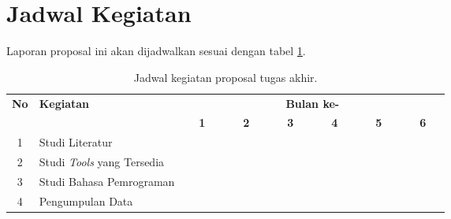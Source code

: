 \section{Jadwal Kegiatan}
Laporan proposal ini akan dijadwalkan sesuai dengan tabel \ref{ScheduleTable}. 
\begin{table}[h!]
  \centering
    \caption{Jadwal kegiatan proposal tugas akhir.}
  \label{ScheduleTable}
  \begin{tabular}{|c|m{2.5cm}|m{0.01cm}|m{0.01cm}|m{0.01cm}|m{0.01cm}|m{0.01cm}|m{0.01cm}|m{0.01cm}|m{0.01cm}|m{0.01cm}|m{0.01cm}|m{0.01cm}|m{0.01cm}|m{0.01cm}|m{0.01cm}|m{0.01cm}|m{0.01cm}|m{0.01cm}|m{0.01cm}|m{0.01cm}|m{0.01cm}|m{0.01cm}|m{0.01cm}|m{0.01cm}|m{0.01cm}|}
    \hline
    \multirow{2}{*}{\textbf{No}} & \multirow{2}{*}{\textbf{Kegiatan}} & \multicolumn{24}{|c|}{\textbf{Bulan ke-}} \\
    \hhline{~~------------------------}
    {} & {} & \multicolumn{4}{|c|}{\textbf{1}} & \multicolumn{4}{|c|}{\textbf{2}} & \multicolumn{4}{|c|}{\textbf{3}} & \multicolumn{4}{|c|}{\textbf{4}} & \multicolumn{4}{|c|}{\textbf{5}} & \multicolumn{4}{|c|}{\textbf{6}}\\
    \hline
    1 & Studi Literatur & \cellcolor{blue!25} & \cellcolor{blue!25} & \cellcolor{blue!25} & \cellcolor{blue!25}& \cellcolor{blue!25} & \cellcolor{blue!25} & \cellcolor{blue!25} & \cellcolor{blue!25}& \cellcolor{blue!25} & \cellcolor{blue!25} & \cellcolor{blue!25} & \cellcolor{blue!25}& \cellcolor{blue!25} & \cellcolor{blue!25} & \cellcolor{blue!25} & \cellcolor{blue!25}& \cellcolor{blue!25} & \cellcolor{blue!25} & \cellcolor{blue!25} & \cellcolor{blue!25}& \cellcolor{blue!25} & \cellcolor{blue!25} & \cellcolor{blue!25} & \cellcolor{blue!25}\\
    \hline
    2 & Studi \textit{Tools} yang Tersedia & \cellcolor{blue!25} & \cellcolor{blue!25} & \cellcolor{blue!25} & \cellcolor{blue!25} &  \cellcolor{blue!25} &  \cellcolor{blue!25} &  \cellcolor{blue!25} &  \cellcolor{blue!25} & {} & {} & {} & {}& {} & {} & {} & {}& {} & {} & {} & {}& {} & {} & {} & {}\\
    \hline
    3 & Studi Bahasa Pemrograman & {} & {} & {} & {} & \cellcolor{blue!25} & \cellcolor{blue!25} & \cellcolor{blue!25} & \cellcolor{blue!25} & {} & {} & {} & {}& {} & {} & {} & {}& {} & {} & {} & {}& {} & {} & {} & {}\\
    \hline
    4 & Pengumpulan Data & {} & {} & {} & {} & \cellcolor{blue!25} & \cellcolor{blue!25} & \cellcolor{blue!25} & \cellcolor{blue!25} & \cellcolor{blue!25} & \cellcolor{blue!25} & \cellcolor{blue!25} & \cellcolor{blue!25} & {} & {} & {} & {}& {} & {} & {} & {} & {} & {} & {} & {}\\

\end{tabular}
\end{table}
